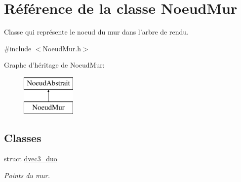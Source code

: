 \hypertarget{class_noeud_mur}{\section{Référence de la classe Noeud\-Mur}
\label{class_noeud_mur}
}


Classe qui représente le noeud du mur dans l'arbre de rendu.  




{\ttfamily \#include $<$Noeud\-Mur.\-h$>$}

Graphe d'héritage de Noeud\-Mur\-:\begin{figure}[H]
\begin{center}
\leavevmode
\includegraphics[height=2.000000cm]{class_noeud_mur}
\end{center}
\end{figure}
\subsection*{Classes}
\begin{DoxyCompactItemize}
\item 
struct \hyperlink{struct_noeud_mur_1_1dvec3__duo}{dvec3\-\_\-duo}
\begin{DoxyCompactList}\small\item\em Points du mur. \end{DoxyCompactList}\end{DoxyCompactItemize}
